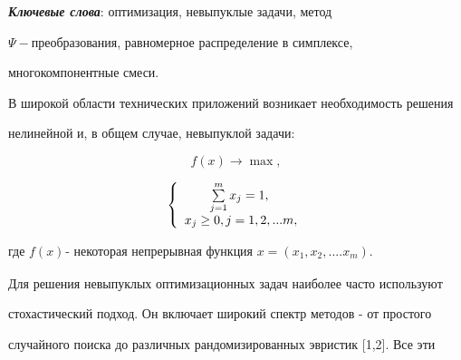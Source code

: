 \documentclass [12pt]{article}
\begin{document}
\textbf{\textit{Ключевые слова}}: оптимизация, невыпуклые задачи, метод 

$\Psi - $преобразования, равномерное распределение в симплексе, 

многокомпонентные смеси. 











В широкой области технических приложений возникает необходимость решения 

нелинейной и, в общем случае, невыпуклой задачи: 





\begin{equation}

\label{eq1}

f(x) \to \max ,

\end{equation}









\begin{equation}

\label{eq2}

\left\{ {{\begin{array}{*{20}c}

 {\sum\limits_{j = 1}^m {x_j = 1,\;} } \\

 {x_j \ge 0,j = 1,2,...m,} \\

\end{array} }} \right.

\end{equation}







\noindent

где $f(x)_{ }$- некоторая непрерывная функция $x = (x_1 ,x_2 ,....x_m )$.



Для решения невыпуклых оптимизационных задач наиболее часто используют 

стохастический подход. Он включает широкий спектр методов - от простого 

случайного поиска до различных рандомизированных эвристик [1,2]. Все эти 
\end{document}
